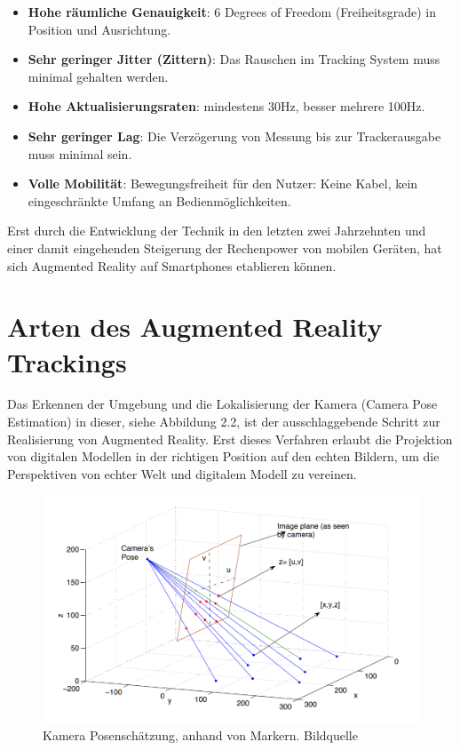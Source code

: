 \begin{itemize}

\item \textbf{Hohe räumliche Genauigkeit}: 6 \glqq Degrees of Freedom\grqq{} (Freiheitsgrade) in Position und Ausrichtung. 

\item \textbf{Sehr geringer Jitter (Zittern)}: Das Rauschen im Tracking System muss minimal gehalten werden.

\item \textbf{Hohe Aktualisierungsraten}: mindestens 30Hz, besser mehrere 100Hz.

\item \textbf{Sehr geringer Lag}: Die Verzögerung von Messung bis zur Trackerausgabe muss minimal sein.

\item \textbf{Volle Mobilität}: Bewegungsfreiheit für den Nutzer: Keine Kabel, kein eingeschränkte Umfang an Bedienmöglichkeiten.
\end{itemize}

Erst durch die Entwicklung der Technik in den letzten zwei Jahrzehnten und einer damit eingehenden Steigerung der Rechenpower von mobilen Geräten, hat sich Augmented Reality auf Smartphones etablieren können.

\section{Arten des Augmented Reality Trackings}

Das Erkennen der Umgebung und die Lokalisierung der Kamera (Camera Pose Estimation) in dieser, siehe Abbildung 2.2, ist der ausschlaggebende Schritt zur Realisierung von Augmented Reality. Erst dieses Verfahren erlaubt die Projektion von digitalen Modellen in der richtigen Position auf den echten Bildern, um die Perspektiven von echter Welt und digitalem Modell zu vereinen. 


\begin{figure}[H]
	\centering
	\includegraphics[scale=0.58]{pose.png}
	\caption{Kamera Posenschätzung, anhand von Markern. Bildquelle \cite{pose}}
\end{figure} 


